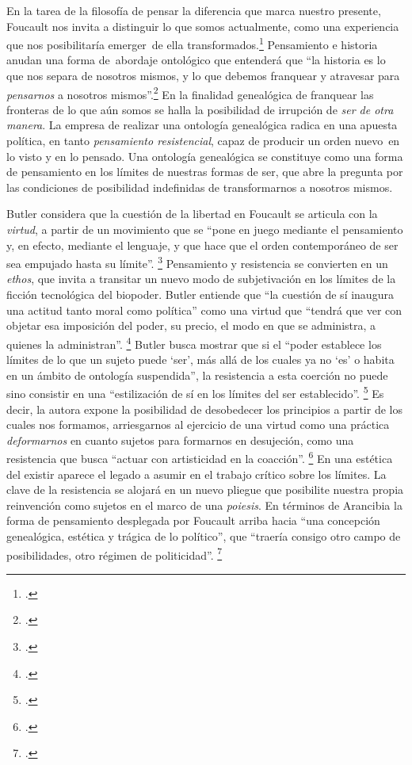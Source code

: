 En la tarea de la filosofía de pensar la diferencia que marca nuestro presente, Foucault nos invita a distinguir lo que somos actualmente, como una experiencia que nos posibilitaría emerger~de ella transformados.\footcite[][13]{@7061-FOUCAULT2009} Pensamiento e historia anudan una forma de~abordaje ontológico que entenderá que \enquote{la historia es lo que nos separa de nosotros mismos, y lo que debemos franquear y atravesar para \emph{pensarnos} a nosotros mismos}.\footcite[][154-155]{@7047-FOUCAULT2008} En la finalidad genealógica de franquear las fronteras de lo que aún somos se halla la posibilidad de irrupción de \emph{ser de otra manera}. La empresa de realizar una ontología genealógica radica en una apuesta política, en tanto \emph{pensamiento resistencial}, capaz de producir un orden nuevo~en lo visto y en lo pensado. Una ontología genealógica se constituye como una forma de pensamiento en los límites de nuestras formas de ser, que abre la pregunta por las condiciones de posibilidad indefinidas de transformarnos a nosotros mismos.

Butler considera que la cuestión de la libertad en Foucault se articula con la \emph{virtud}, a partir de un movimiento que se \enquote{pone en juego mediante el pensamiento y, en efecto, mediante el lenguaje, y que hace que el orden contemporáneo de ser sea empujado hasta su límite}. \footcite[][8]{@7036-BUTLER2001} Pensamiento y resistencia se convierten en un \emph{ethos}, que invita a transitar un nuevo modo de subjetivación en los límites de la ficción tecnológica del biopoder. Butler entiende que \enquote{la cuestión de sí inaugura una actitud tanto moral como política} como una virtud que \enquote{tendrá que ver con objetar esa imposición del poder, su precio, el modo en que se administra, a quienes la administran}. \footcite[][6]{@7036-BUTLER2001} Butler busca mostrar que si el \enquote{poder establece los límites de lo que un sujeto puede \enquote{ser}, más allá de los cuales ya no \enquote{es} o habita en un ámbito de ontología suspendida}, la resistencia a esta coerción no puede sino consistir en una \enquote{estilización de sí en los límites del ser establecido}. \footcite[][9]{@7036-BUTLER2001} Es decir, la autora expone la posibilidad de desobedecer los principios a partir de los cuales nos formamos, arriesgarnos al ejercicio de una virtud como una práctica \emph{deformarnos} en cuanto sujetos para formarnos en desujeción, como una resistencia que busca \enquote{actuar con artisticidad en la coacción}. \footcite[][12-13]{@7036-BUTLER2001} En una estética del existir aparece el legado a asumir en el trabajo crítico sobre los límites. La clave de la resistencia se alojará en un nuevo pliegue que posibilite nuestra propia reinvención como sujetos en el marco de una \emph{poiesis}. En términos de Arancibia la forma de pensamiento desplegada por Foucault arriba hacia \enquote{una concepción genealógica, estética y trágica de lo político}, que \enquote{traería consigo otro campo de posibilidades, otro régimen de politicidad}. \footcite[][114-115]{@7055-ARANCIBIA2005}

